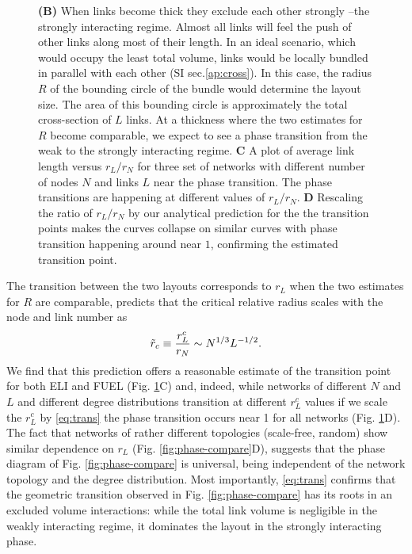 \documentclass[nofootinbib,preprint,floatfix,titlepage,endfloats,superscriptaddress]{revtex4} %
\begin{document}
{\begin{figure}
{    {\bf (B)} When links become thick they exclude each other strongly --the strongly interacting regime. 
    Almost all links will feel the push of other links along most of their length. 
    In an ideal scenario, which would occupy the least total volume, links would be locally bundled in parallel with each other (SI sec.\ref{ap:cross}). 
    In this case, the radius $R$ of the bounding circle of the bundle would determine the layout size.
    The area of this bounding circle is approximately the total cross-section of $L$ links. 
    At a thickness where the two estimates for $R$ become comparable, we expect to see a phase transition from the weak to the strongly interacting regime. 
    {\bf C} A plot of average link length versus $r_L/r_N$ for three set of networks with different number of nodes $N$ and links $L$ near the phase transition. The phase transitions are happening at different values of $r_L/r_N$. 
    {\bf D} Rescaling the ratio of $r_L/r_N$ by our analytical prediction for the the transition points makes the curves collapse on similar curves with phase transition happening around near $1$, confirming the estimated transition point. }
    \label{fig:trans}
\end{figure}
}%
The transition between the two layouts corresponds to   $r_L$ when the two estimates for $R$ are comparable, predicts that the critical relative radius  scales with the node and link number as
\begin{equation}
    \tilde{r}_c \equiv {r^c_L\over r_N} \sim N^{1/3} L^{-1/2}. \label{eq:trans}
\end{equation}
We find that this prediction offers a reasonable estimate of the transition point for both ELI and FUEL 
(Fig. \ref{fig:trans}C) and,  
indeed, while networks of different $N$ and $L$ and different degree distributions transition at different $r_L^c$ values if we scale the $r_L^c$ by \eqref{eq:trans} the phase transition occurs near 1 for all networks (Fig. \ref{fig:trans}D).   
The fact that networks of rather different topologies (scale-free, random) show similar dependence on $r_L$ (Fig. \ref{fig:phase-compare}D), 
suggests that the phase diagram of Fig. \ref{fig:phase-compare} is universal, being independent of the network topology and the degree distribution. 
Most importantly, \eqref{eq:trans} confirms that the geometric transition observed in Fig. \ref{fig:phase-compare} has its roots in an excluded volume interactions: while the total link volume is negligible in the weakly interacting regime, it dominates the layout in the strongly interacting phase. 
\end{document}
